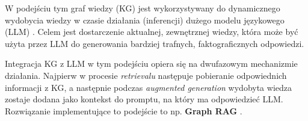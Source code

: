 \documentclass[
a4paper,
12pt,
]{article}
\begin{document}

W podejściu tym graf wiedzy (KG) jest wykorzystywany do dynamicznego wydobycia wiedzy w czasie działania (inferencji) dużego modelu językowego (LLM)
. %
Celem jest dostarczenie aktualnej, zewnętrznej wiedzy, która może być użyta przez LLM do generowania bardziej trafnych, faktograficznych odpowiedzi.

Integracja KG z LLM w tym podejściu opiera się na dwufazowym mechanizmie działania. Najpierw w procesie \textit{retrievalu} następuje pobieranie odpowiednich informacji z KG, a następnie podczas \textit{augmented generation} wydobyta wiedza zostaje dodana jako kontekst do promptu, na który ma odpowiedzieć LLM.
Rozwiązanie implementujące to podejście to np. \textbf{Graph RAG} \cite{graphRAG}.




\end{document}
